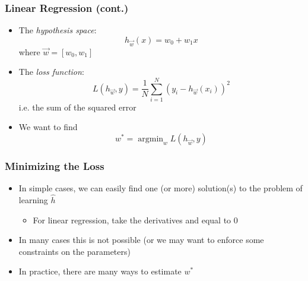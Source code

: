 \documentclass{beamer}
\newcommand{\hh}{\hat{h}}
\DeclareMathOperator*{\argmin}{argmin}
\begin{document}
\newcommand{\ww}{\vec{w}}
\begin{frame}
    \frametitle{Linear Regression (cont.)}
    \begin{itemize}
    \item The \emph{hypothesis space}:
        \begin{displaymath}
            h_{\ww}(x) = w_0 + w_1x
        \end{displaymath}
        where $\ww = [w_0, w_1]$
    \item The \emph{loss function}:
        \begin{displaymath}
            L(h_{\ww},y) = \frac{1}{N}\sum_{i=1}^N(y_i - h_{\ww}(x_i))^2
        \end{displaymath}
        i.e. the sum of the squared error
    \item We want to find
        \begin{displaymath}
            w^* = \argmin_w L(h_{\ww},y)
        \end{displaymath}
    \end{itemize}
\end{frame}

\begin{frame}
    \frametitle{Minimizing the Loss}
    \begin{itemize}
    \item In simple cases, we can easily find one (or more) solution(s) to the problem of learning $\hh$
        \begin{itemize}
        \item For linear regression, take the derivatives and equal to $0$
        \end{itemize}
    \item In many cases this is not possible (or we may want to enforce some
        constraints on the parameters) %
    \item In practice, there are many ways to estimate $w^*$
    \end{itemize}
\end{frame}
\end{document}

